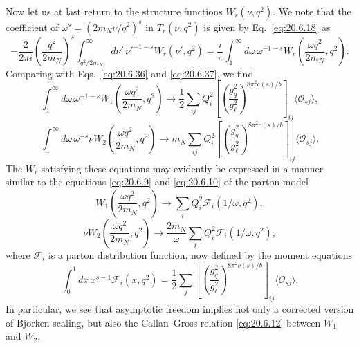 Now let us at last return to the structure functions $W_r(\nu,q^2)$. We note that the coefficient of $\omega^s=(2m_N\nu/q^2)^s$ in $T_r(\nu,q^2)$ is given by Eq.~\eqref{eq:20.6.18} as
\[
-\frac{2}{2\pi i}
\left(\frac{q^2}{2m_N}\right)^s
\int_{q^2/2m_N}^{\infty}d\nu'\,
\nu'^{-1-s}W_r(\nu',q^2)
=\frac{i}{\pi}\int_1^\infty d\omega\,
\omega^{-1-s}
W_r\left(\frac{\omega q^2}{2m_N},q^2\right).
\]
Comparing with Eqs.~\eqref{eq:20.6.36} and \eqref{eq:20.6.37}, we find
\begin{equation}
\int_1^\infty d\omega\,\omega^{-1-s}
W_1\left(\frac{\omega q^2}{2m_N},q^2\right)
\longrightarrow
\frac12\sum_{ij}Q_i^2
\left[
\left(\frac{g_q^2}{g_\ell^2}\right)^{8\pi^2c(s)/b}
\right]_{ij}
\langle\mathcal O_{sj}\rangle,
\tag{20.6.38}\label{eq:20.6.38}
\end{equation}
\begin{equation}
\int_1^\infty d\omega\,\omega^{-s}\nu
W_2\left(\frac{\omega q^2}{2m_N},q^2\right)
\longrightarrow
m_N\sum_{ij}Q_i^2
\left[
\left(\frac{g_q^2}{g_\ell^2}\right)^{8\pi^2c(s)/b}
\right]_{ij}
\langle\mathcal O_{sj}\rangle.
\tag{20.6.39}\label{eq:20.6.39}
\end{equation}
The $W_r$ satisfying these equations may evidently be expressed in a manner similar to the equations \eqref{eq:20.6.9} and \eqref{eq:20.6.10} of the parton model
\begin{equation}
W_1\left(\frac{\omega q^2}{2m_N},q^2\right)
\longrightarrow
\sum_iQ_i^2\mathcal F_i(1/\omega,q^2),
\tag{20.6.40}\label{eq:20.6.40}
\end{equation}
\begin{equation}
\nu W_2\left(\frac{\omega q^2}{2m_N},q^2\right)
\longrightarrow
\frac{2m_N}{\omega}
\sum_iQ_i^2\mathcal F_i(1/\omega,q^2),
\tag{20.6.41}\label{eq:20.6.41}
\end{equation}
where $\mathcal F_i$ is a parton distribution function, now defined by the moment equations
\begin{equation}
\int_0^1dx\,x^{s-1}\mathcal F_i(x,q^2)
=\frac12\sum_j
\left[
\left(\frac{g_q^2}{g_\ell^2}\right)^{8\pi^2c(s)/b}
\right]_{ij}
\langle\mathcal O_{sj}\rangle.
\tag{20.6.42}\label{eq:20.6.42}
\end{equation}
In particular, we see that asymptotic freedom implies not only a corrected version of Bjorken scaling, but also the Callan--Gross relation \eqref{eq:20.6.12} between $W_1$ and $W_2$.

